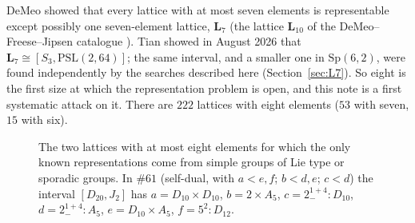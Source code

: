 \documentclass[11pt]{article}
\theoremstyle{remark}
\newcommand{\LL}{\mathbf{L}_7}
\newcommand{\lat}[1]{\##1}
\begin{document}
DeMeo \cite[Ch.~6]{DeMeo2012} showed that every lattice with at most seven elements is
representable except possibly one seven-element lattice, $\LL$ (the lattice $\mathbf L_{10}$ of the
DeMeo--Freese--Jipsen catalogue \cite{DeMeoFreese}). Tian \cite{Tian2026} showed in August 2026
that $\LL\cong[S_3,\mathrm{PSL}(2,64)]$; the same interval, and a smaller one in $\mathrm{Sp}(6,2)$,
were found independently by the searches described here (Section~\ref{sec:L7}). So eight is the
first size at which the representation problem is open, and this note is a first systematic
attack on it. There are $222$ lattices with eight elements ($53$ with seven, $15$ with six).

\begin{figure}[htb]
\centering
{}
\caption{The two lattices with at most eight elements for which the only known representations
come from simple groups of Lie type or sporadic groups. In $\lat{61}$ (self-dual, with
$a<e,f$; $b<d,e$; $c<d$) the interval $[D_{20},J_2]$ has $a=D_{10}\times D_{10}$, $b=2\times A_5$,
$c=2^{1+4}_-{:}D_{10}$, $d=2^{1+4}_-{:}A_5$, $e=D_{10}\times A_5$, $f=5^2{:}D_{12}$.}
\label{fig:two}
\end{figure}
\end{document}
